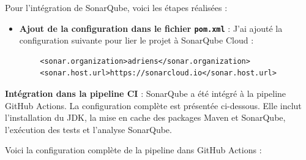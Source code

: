 \documentclass{article}
\begin{document}
	Pour l'intégration de SonarQube, voici les étapes réalisées :
	\begin{itemize}
		\item \textbf{Ajout de la configuration dans le fichier \texttt{pom.xml}} : J'ai ajouté la configuration suivante pour lier le projet à SonarQube Cloud :
	\end{itemize}
	\begin{verbatim}
		<sonar.organization>adriens</sonar.organization>
		<sonar.host.url>https://sonarcloud.io</sonar.host.url>
	\end{verbatim}
	
	\noindent
	\textbf{Intégration dans la pipeline CI} : SonarQube a été intégré à la pipeline GitHub Actions. La configuration complète est présentée ci-dessous. Elle inclut l'installation du JDK, la mise en cache des packages Maven et SonarQube, l'exécution des tests et l'analyse SonarQube.
	
	Voici la configuration complète de la pipeline dans GitHub Actions :
	
\end{document}
